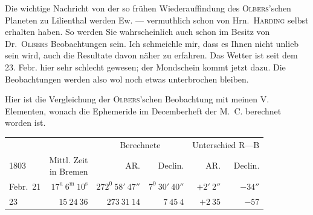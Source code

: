 Die wichtige Nachricht von der so frühen Wiederauffindung des \textsc{Olbers}'schen Planeten zu Lilienthal werden Ew. — vermuthlich schon von Hrn.\ \textsc{Harding} selbst erhalten haben. So werden Sie wahrscheinlich auch schon im Besitz von Dr.\ \textsc{Olbers} Beobachtungen sein. Ich schmeichle mir, dass es Ihnen nicht unlieb sein wird, auch die Resultate davon näher zu erfahren. Das Wetter ist seit dem 23. Febr. hier sehr schlecht gewesen; der Mondschein kommt jetzt dazu. Die Beobachtungen werden also wol noch etwas unterbrochen bleiben.

Hier ist die Vergleichung der \textsc{Olbers}'schen Beobachtung mit meinen V. Elementen, wonach die Ephemeride im Decemberheft der M.\ C. berechnet worden ist.
\begin{center}
\begingroup\small\setlength{\tabcolsep}{3pt}
\begin{tabular}{l|r|r|r|r|r}
& &\multicolumn{2}{c|}{Berechnete}&\multicolumn{2}{c}{Unterschied R—B}\\
1803&\shortstack{Mittl. Zeit\\in Bremen}&AR.&Declin.&AR.&Declin.\\\hline
Febr.\ 21&$17^{\mathrm u}\ 6^{\mathrm m}\ 10^{\mathrm s}$&$272^0\ 58'\ 47''$&$7^0\ 30'\ 40''$&$+2'\ 2''$&$-34''$\\
23&$15\ 24\ 36$&$273\ 31\ 14$&$7\ 45\ 4$&$+2\ 35$&$-57$
\end{tabular}\endgroup
\end{center}

